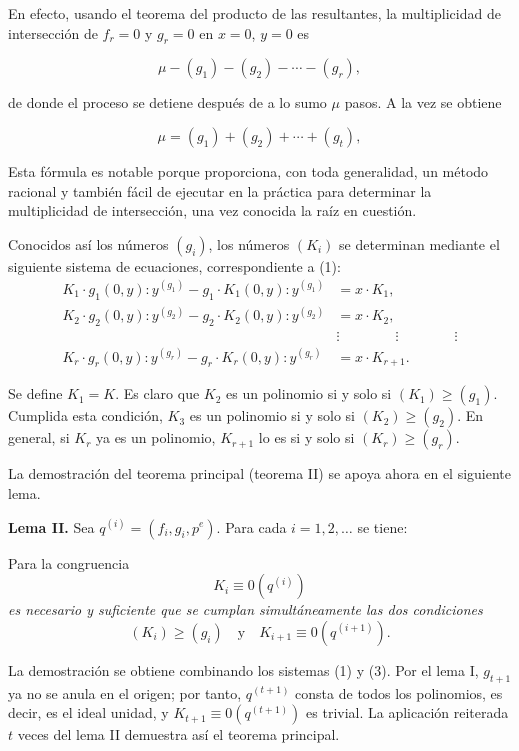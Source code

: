 En efecto, usando el teorema del producto de las resultantes, la multiplicidad de intersección de $f_r=0$ y $g_r=0$ en $x=0$, $y=0$ es

\[
\mu-(g_1)-(g_2)-\cdots-(g_r),
\]

de donde el proceso se detiene después de a lo sumo $\mu$ pasos. A la vez se obtiene

\begin{equation}
\tag{2}
\mu=(g_1)+(g_2)+\cdots+(g_t),
\end{equation}

Esta fórmula es notable porque proporciona, con toda generalidad, un método racional y también fácil de ejecutar en la práctica para determinar la multiplicidad de intersección, una vez conocida la raíz en cuestión.

Conocidos así los números $(g_i)$, los números $(K_i)$ se determinan mediante el siguiente sistema de ecuaciones, correspondiente a (1):
\begin{equation}
\tag{3}
\begin{aligned}
K_1\cdot g_1(0,y):y^{(g_1)}-g_1\cdot K_1(0,y):y^{(g_1)}&=x\cdot K_1,\\
K_2\cdot g_2(0,y):y^{(g_2)}-g_2\cdot K_2(0,y):y^{(g_2)}&=x\cdot K_2,\\
&\vdots \qquad\qquad\vdots\qquad\qquad\vdots\\
K_r\cdot g_r(0,y):y^{(g_r)}-g_r\cdot K_r(0,y):y^{(g_r)}&=x\cdot K_{r+1}.
\end{aligned}
\end{equation}

Se define $K_1=K$. Es claro que $K_2$ es un polinomio si y solo si $(K_1)\geq(g_1)$. Cumplida esta condición, $K_3$ es un polinomio si y solo si $(K_2)\geq(g_2)$. En general, si $K_r$ ya es un polinomio, $K_{r+1}$ lo es si y solo si $(K_r)\geq(g_r)$.

La demostración del teorema principal (teorema II) se apoya ahora en el siguiente lema.

\textbf{Lema II.} Sea $q^{(i)}=(f_i,g_i,p^e)$. Para cada $i=1,2,\ldots$ se tiene:

Para la congruencia
\[
K_i\equiv0(q^{(i)})
\]
\emph{es necesario y suficiente que se cumplan simultáneamente las dos condiciones}
\[
(K_i)\geq(g_i)\quad\text{y}\quad K_{i+1}\equiv0(q^{(i+1)}).
\]

La demostración se obtiene combinando los sistemas (1) y (3). Por el lema I, $g_{t+1}$ ya no se anula en el origen; por tanto, $q^{(t+1)}$ consta de todos los polinomios, es decir, es el ideal unidad, y $K_{t+1}\equiv0(q^{(t+1)})$ es trivial. La aplicación reiterada $t$ veces del lema II demuestra así el teorema principal.

